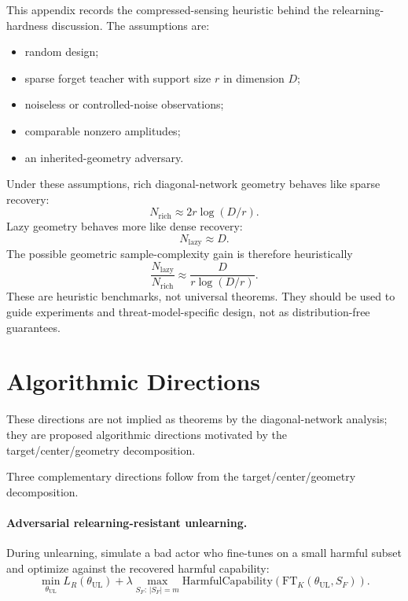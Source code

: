 \documentclass[11pt]{article}
\begin{document}
This appendix records the compressed-sensing heuristic behind the relearning-hardness discussion. The assumptions are:
\begin{itemize}
    \item random design;
    \item sparse forget teacher with support size \(r\) in dimension \(D\);
    \item noiseless or controlled-noise observations;
    \item comparable nonzero amplitudes;
    \item an inherited-geometry adversary.
\end{itemize}
Under these assumptions, rich diagonal-network geometry behaves like sparse recovery:
\begin{equation}
    N_{\mathrm{rich}}
    \approx
    2r\log(D/r).
\end{equation}
Lazy geometry behaves more like dense recovery:
\begin{equation}
    N_{\mathrm{lazy}}
    \approx
    D.
\end{equation}
The possible geometric sample-complexity gain is therefore heuristically
\begin{equation}
    \frac{N_{\mathrm{lazy}}}{N_{\mathrm{rich}}}
    \approx
    \frac{D}{r\log(D/r)}.
\end{equation}
These are heuristic benchmarks, not universal theorems. They should be used to guide experiments and threat-model-specific design, not as distribution-free guarantees.

\section{Algorithmic Directions}

These directions are not implied as theorems by the diagonal-network analysis; they are proposed algorithmic directions motivated by the target/center/geometry decomposition.

Three complementary directions follow from the target/center/geometry decomposition.

\paragraph{Adversarial relearning-resistant unlearning.}
During unlearning, simulate a bad actor who fine-tunes on a small harmful subset and optimize against the recovered harmful capability:
\begin{equation}
    \min_{\theta_{\mathrm{UL}}}
    L_R(\theta_{\mathrm{UL}})
    +
    \lambda
    \max_{S_F:\,|S_F|=m}
    \mathrm{HarmfulCapability}
    \left(
        \mathrm{FT}_K(\theta_{\mathrm{UL}},S_F)
    \right).
\end{equation}
\end{document}
